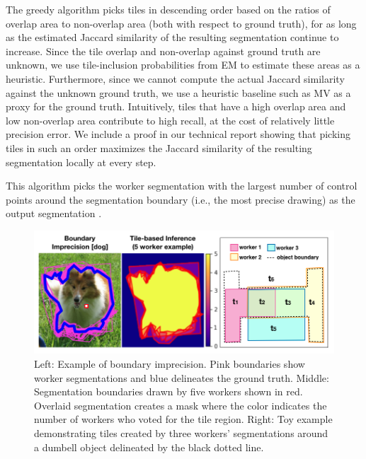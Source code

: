 \par \noindent The greedy algorithm picks tiles in descending order based on the ratios of overlap area to non-overlap area (both with respect to ground truth), for as long as the estimated Jaccard similarity of the resulting segmentation continue to increase. Since the tile overlap and non-overlap against ground truth are unknown, we use tile-inclusion probabilities from EM to estimate these areas as a heuristic. Furthermore, since we cannot compute the actual Jaccard similarity against the unknown ground truth, we use a heuristic baseline such as MV as a proxy for the ground truth. Intuitively, tiles that have a high overlap area and low non-overlap area contribute to high recall, at the cost of relatively little precision error. We include a proof in our technical report showing that picking tiles in such an order maximizes the Jaccard similarity of the resulting segmentation locally at every step. 

\par \noindent This algorithm picks the worker segmentation with the largest number of control points around the segmentation boundary (i.e., the most precise drawing) as the output segmentation \cite{Vittayakorn2011,Sorokin2008}.

\begin{figure}[h!]
\centering
\includegraphics[width=0.85\linewidth]{plots/precision_issue_tile_example.png}
\caption{Left: Example of boundary imprecision. Pink boundaries show worker segmentations and blue delineates the ground truth. Middle: Segmentation boundaries drawn by five workers shown in red. Overlaid segmentation creates a mask where the color indicates the number of workers who voted for the tile region. Right: Toy example demonstrating tiles created by three workers' segmentations around a dumbell object delineated by the black dotted line.}
\label{tile_demo}
\setlength{\abovecaptionskip}{-15pt}
\setlength{\belowcaptionskip}{-25pt}
\end{figure}  